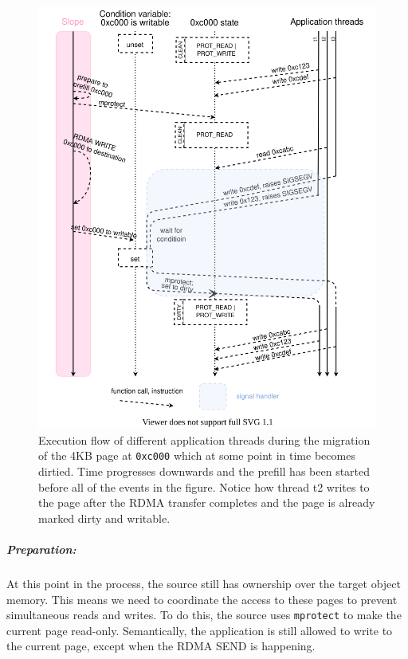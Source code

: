 \begin{figure}[tp]
\centering

\includegraphics[width=1\textwidth]{dirty-detection.drawio}
\caption{
    Execution flow of different application threads during the migration of
    the 4KB page at \texttt{0xc000} which at some point in time becomes dirtied.
    Time progresses downwards and the prefill has been started before all of
    the events in the figure. Notice how thread t2 writes to the page after the
    RDMA transfer completes and the page is already marked dirty and writable.
}
\label{fig:dirtydetection}
\end{figure}

\subparagraph{Preparation:} At this point in the process, the source still
has ownership over the target object memory. This means we need to coordinate
the access to these pages to prevent simultaneous reads and writes. To do this,
the source uses \texttt{mprotect} to make the current page read-only.
Semantically, the application is still allowed to write to the current page,
except when the RDMA SEND is happening.

